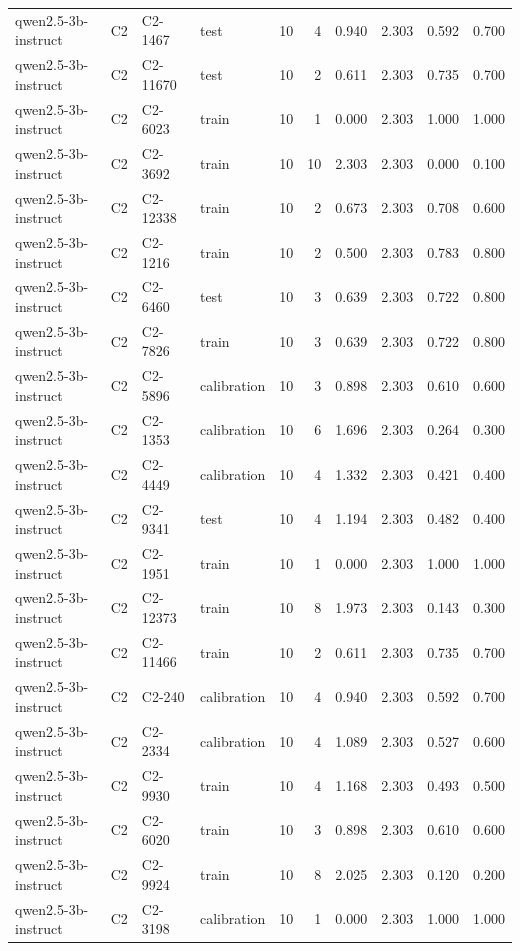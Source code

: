 \begin{table}
\begin{tabular}{llllrrrrrr}
qwen2.5-3b-instruct & C2 & C2-1467 & test & 10 & 4 & 0.940 & 2.303 & 0.592 & 0.700 \\
qwen2.5-3b-instruct & C2 & C2-11670 & test & 10 & 2 & 0.611 & 2.303 & 0.735 & 0.700 \\
qwen2.5-3b-instruct & C2 & C2-6023 & train & 10 & 1 & 0.000 & 2.303 & 1.000 & 1.000 \\
qwen2.5-3b-instruct & C2 & C2-3692 & train & 10 & 10 & 2.303 & 2.303 & 0.000 & 0.100 \\
qwen2.5-3b-instruct & C2 & C2-12338 & train & 10 & 2 & 0.673 & 2.303 & 0.708 & 0.600 \\
qwen2.5-3b-instruct & C2 & C2-1216 & train & 10 & 2 & 0.500 & 2.303 & 0.783 & 0.800 \\
qwen2.5-3b-instruct & C2 & C2-6460 & test & 10 & 3 & 0.639 & 2.303 & 0.722 & 0.800 \\
qwen2.5-3b-instruct & C2 & C2-7826 & train & 10 & 3 & 0.639 & 2.303 & 0.722 & 0.800 \\
qwen2.5-3b-instruct & C2 & C2-5896 & calibration & 10 & 3 & 0.898 & 2.303 & 0.610 & 0.600 \\
qwen2.5-3b-instruct & C2 & C2-1353 & calibration & 10 & 6 & 1.696 & 2.303 & 0.264 & 0.300 \\
qwen2.5-3b-instruct & C2 & C2-4449 & calibration & 10 & 4 & 1.332 & 2.303 & 0.421 & 0.400 \\
qwen2.5-3b-instruct & C2 & C2-9341 & test & 10 & 4 & 1.194 & 2.303 & 0.482 & 0.400 \\
qwen2.5-3b-instruct & C2 & C2-1951 & train & 10 & 1 & 0.000 & 2.303 & 1.000 & 1.000 \\
qwen2.5-3b-instruct & C2 & C2-12373 & train & 10 & 8 & 1.973 & 2.303 & 0.143 & 0.300 \\
qwen2.5-3b-instruct & C2 & C2-11466 & train & 10 & 2 & 0.611 & 2.303 & 0.735 & 0.700 \\
qwen2.5-3b-instruct & C2 & C2-240 & calibration & 10 & 4 & 0.940 & 2.303 & 0.592 & 0.700 \\
qwen2.5-3b-instruct & C2 & C2-2334 & calibration & 10 & 4 & 1.089 & 2.303 & 0.527 & 0.600 \\
qwen2.5-3b-instruct & C2 & C2-9930 & train & 10 & 4 & 1.168 & 2.303 & 0.493 & 0.500 \\
qwen2.5-3b-instruct & C2 & C2-6020 & train & 10 & 3 & 0.898 & 2.303 & 0.610 & 0.600 \\
qwen2.5-3b-instruct & C2 & C2-9924 & train & 10 & 8 & 2.025 & 2.303 & 0.120 & 0.200 \\
qwen2.5-3b-instruct & C2 & C2-3198 & calibration & 10 & 1 & 0.000 & 2.303 & 1.000 & 1.000 \\

\end{tabular}
\end{table}
